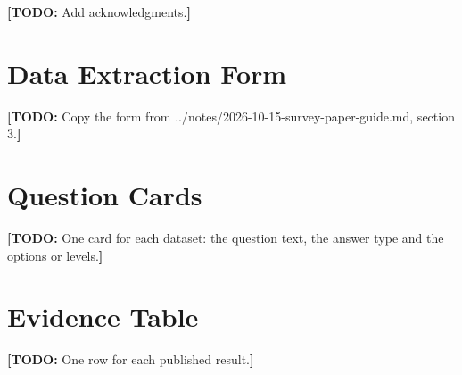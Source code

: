 \documentclass[acmsmall,nonacm,screen]{acmart}
\newcommand{\todo}[1]{{\color{red}\textbf{[TODO: }#1\textbf{]}}}
\begin{document}
\begin{acks}
\todo{Add acknowledgments.}
\end{acks}




\appendix

\section{Data Extraction Form}
\todo{Copy the form from ../notes/2026-10-15-survey-paper-guide.md, section 3.}

\section{Question Cards}
\todo{One card for each dataset: the question text, the answer type and the options or levels.}

\section{Evidence Table}
\todo{One row for each published result.}
\end{document}
